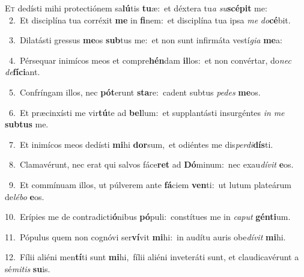 \lettrine{\initial\textcolor{\initialcolor}{E}}{t} dedísti mihi protectiónem sa\-\textbf{lú}\-tis \textbf{tu}\-æ:~\star et déxtera tu\textit{a} \textit{su}\-\textbf{scé}\textbf{pit} me:\\
{\numbfont\textcolor{\numbcolor}{~2.}}~Et disciplína tua corréxit \textbf{me} in \textbf{fi}\-nem:~\star et disciplína tua ipsa \textit{me} \textit{do}\-\textbf{cé}bit.\par
{\numbfont\textcolor{\numbcolor}{~3.}}~Dilatásti gressus \textbf{me}\-os \textbf{sub}\-tus me:~\star et non sunt infirmáta vestí\-\textit{gi}\-\textit{a} \textbf{me}\-a:\par
{\numbfont\textcolor{\numbcolor}{~4.}}~Pérsequar inimícos meos et compre\-\textbf{hén}\-dam \textbf{il}\-los:~\star et non convértar, do\textit{nec} \textit{de}\-\textbf{fí}\textbf{ci}ant.\par
{\numbfont\textcolor{\numbcolor}{~5.}}~Confríngam illos, nec \textbf{pót}\-erunt \textbf{sta}\-re:~\star cadent subtus \textit{pe}\-\textit{des} \textbf{me}\-os.\par
{\numbfont\textcolor{\numbcolor}{~6.}}~Et præcinxísti me vir\-\textbf{tú}\-te ad \textbf{bel}\-lum:~\star et supplantásti insurgéntes \textit{in} \textit{me} \textbf{sub}\-\textbf{tus} me.\par
{\numbfont\textcolor{\numbcolor}{~7.}}~Et inimícos meos dedísti \textbf{mi}\-hi \textbf{dor}\-sum,~\star et odiéntes me dis\-\textit{per}\-\textit{di}\textbf{dís}ti.\par
{\numbfont\textcolor{\numbcolor}{~8.}}~Clamavérunt, nec erat qui salvos fáce\textbf{ret} ad \textbf{Dó}\-minum:~\star nec exau\-\textit{dí}\-\textit{vit} \textbf{e}\-os.\par
{\numbfont\textcolor{\numbcolor}{~9.}}~Et commínuam illos, ut púlverem ante \textbf{fá}\-ciem \textbf{ven}\-ti:~\star ut lutum plateárum de\-\textit{lé}\-\textit{bo} \textbf{e}\-os.\par
{\numbfont\textcolor{\numbcolor}{10.}}~Erípies me de contradicti\-\textbf{ó}\-nibus \textbf{pó}\-puli:~\star constítues me in \textit{ca}\-\textit{put} \textbf{gén}\-\textbf{ti}um.\par
{\numbfont\textcolor{\numbcolor}{11.}}~Pópulus quem non cognóvi ser\-\textbf{ví}\-vit \textbf{mi}\-hi:~\star in audítu auris obe\-\textit{dí}\-\textit{vit} \textbf{mi}\-hi.\par
{\numbfont\textcolor{\numbcolor}{12.}}~Fílii aliéni men\-\textbf{tí}\-ti sunt \textbf{mi}\-hi,~\star fílii aliéni inveteráti sunt, et claudicavérunt a sé\-\textit{mi}\-\textit{tis} \textbf{su}\-is.\par
